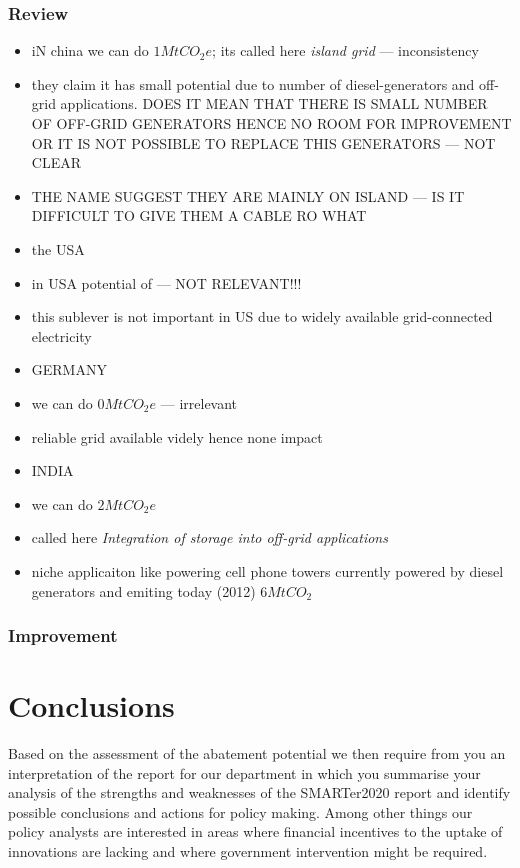 \documentclass[11pt, twocolumn]{article}
\begin{document}
\subsubsection{Review}
\begin{itemize}
\item iN china we can do $1 Mt CO_2e$; its called here \emph{island grid} --- inconsistency
\item they claim it has small potential due to number of diesel-generators and off-grid applications. DOES IT MEAN THAT THERE IS SMALL NUMBER OF OFF-GRID GENERATORS HENCE NO ROOM FOR IMPROVEMENT OR IT IS NOT POSSIBLE TO REPLACE THIS GENERATORS --- NOT CLEAR
\item THE NAME SUGGEST THEY ARE MAINLY ON ISLAND --- IS IT DIFFICULT TO GIVE THEM A CABLE RO WHAT

\item the USA
\item in USA potential of --- NOT RELEVANT!!!
\item this sublever is not important in US due to widely available grid-connected electricity

\item GERMANY
\item we can do $0 Mt CO_2e$ --- irrelevant
\item reliable grid available videly hence none impact


\item INDIA
\item we can do $2 Mt CO_2e$
\item called here \emph{Integration of storage into off-grid applications}
\item niche applicaiton like powering cell phone towers currently powered by diesel generators and emiting today (2012) $6 MtCO_2$

\end{itemize}
\subsubsection{Improvement}

\section{Conclusions}
Based on the assessment of the abatement potential we then require from you an interpretation of the report for our department in which you summarise your analysis of the strengths and weaknesses of the SMARTer2020 report and identify possible conclusions and actions for policy making. Among other things our policy analysts are interested in areas where financial incentives to the uptake of innovations are lacking and where government intervention might be required.\\
\end{document}
